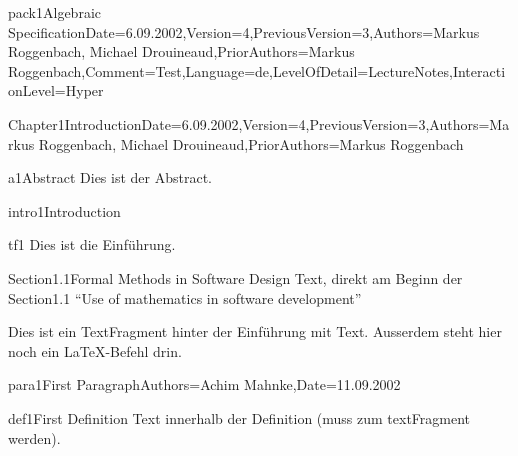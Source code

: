 \documentclass[landscape, slides, light]{mmiss2}
\begin{document}
\begin{Package}{pack1}{Algebraic
Specification}{Date=6.09.2002,Version=4,PreviousVersion=3,Authors={Markus
Roggenbach, Michael Drouineaud},PriorAuthors={Markus
Roggenbach},Comment=Test,Language=de,LevelOfDetail=LectureNotes,InteractionLevel=Hyper}


\begin{Section}{Chapter1}{Introduction}{Date=6.09.2002,Version=4,PreviousVersion=3,Authors={Markus
Roggenbach, Michael Drouineaud},PriorAuthors={Markus Roggenbach}}
\begin{Abstract}[]{a1}{Abstract}{}
  Dies ist der Abstract.
\end{Abstract}
\begin{Introduction}[]{intro1}{Introduction}{}
\begin{TextFragment}[Latex]{tf1}{}
    Dies ist die Einf\"uhrung.
\end{TextFragment}
\end{Introduction}

\begin{Section}{Section1.1}{Formal Methods in Software Design}{}
  Text, direkt am Beginn der Section1.1 
  ``Use of mathematics in software development''\\
\begin{TextFragment}[]{}{}
  Dies ist ein TextFragment hinter der Einf\"uhrung mit
   Text. Ausserdem steht hier noch
  ein \LaTeX{}-Befehl drin.
\end{TextFragment}

\begin{Paragraph}[]{para1}{First Paragraph}{Authors=Achim Mahnke,Date=11.09.2002}
\begin{Definition}[]{def1}{First Definition}{}
  Text innerhalb der Definition (muss zum textFragment werden).


\end{Definition}
\end{Paragraph}
\end{Section}
\end{Section}
\end{Package}
\end{document}
